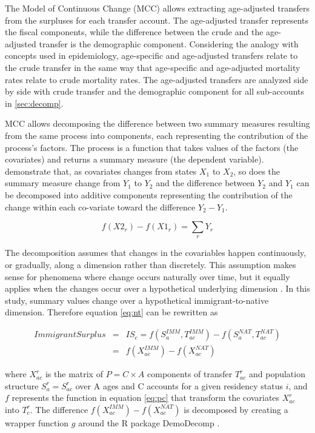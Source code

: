 The Model of Continuous Change (MCC) allows extracting age-adjusted transfers from the surpluses for each transfer account.
The age-adjusted transfer represents the fiscal components, while the difference between the crude and the age-adjusted transfer is the demographic component.
Considering the analogy with concepts used in epidemiology, age-specific and age-adjusted transfers relate to the crude transfer in the same way that age-specific and age-adjusted mortality rates relate to crude mortality rates.
The age-adjusted transfers are analyzed side by side with crude transfer and the demographic component for all sub-accounts in \autoref{sec:decomp}.

MCC allows decomposing the difference between two summary measures resulting from the same process into components, each representing the contribution of the process's factors.
The process is a function that takes values of the factors (the covariates) and returns a summary measure (the dependent variable).
\citet{Horiuchi:2008cn} demonstrate that, as covariates changes from states \( X_1 \) to \( X_2 \),  so does the summary measure change from \( Y_1 \) to \( Y_2 \)  and the difference between \( Y_2 \) and \( Y_1 \) can be decomposed into additive components representing the contribution of the change within each co-variate toward the difference \( Y_2 - Y_1\).

\begin{equation}\label{eq:ho}
  f(X2_{r}) - f(X1_{r}) = \displaystyle\sum_{r}Y_{r}
\end{equation}

The decomposition assumes that changes in the covariables happen continuously, or gradually, along a dimension rather than discretely.
This assumption makes sense for phenomena where change occurs naturally over time, but it equally applies when the changes occur over a hypothetical underlying dimension \citep[p.~790]{Horiuchi:2008cn}.
In this study, summary values change over a hypothetical immigrant-to-native dimension.
Therefore equation \eqref{eq:nt} can be rewritten as

\begin{eqnarray}
  Immigrant Surplus &=&IS_{c}=f(S^{IMM}_a, T^{IMM}_{ac})-f(S^{NAT}_a, T^{NAT}_{ac}) \nonumber \\
&=& f(X^{IMM}_{ac})-f(X^{NAT}_{ac}) \label{eq:dc}
\end{eqnarray}

\vspace{0.7em}\par
where \( X^{r}_{ac}\) is the matrix of \( P=C \times A  \) components of transfer \( T^{r}_{ac} \) and population structure \( S^{r}_{a}=S^{r}_{ac} \) over A ages and C accounts for a given residency status \( i \), and \( f \) represents the function in equation \eqref{eq:pc} that transform the covariates \( X^{r}_{ac}\) into \(T^{r}_c\).
The difference \( f(X^{IMM}_{ac}) - f(X^{NAT}_{ac}) \) is decomposed by creating a wrapper function \(g\) around the R \citep{Rstat:2018} package DemoDecomp \citep{DemoDecomp:2018}.

